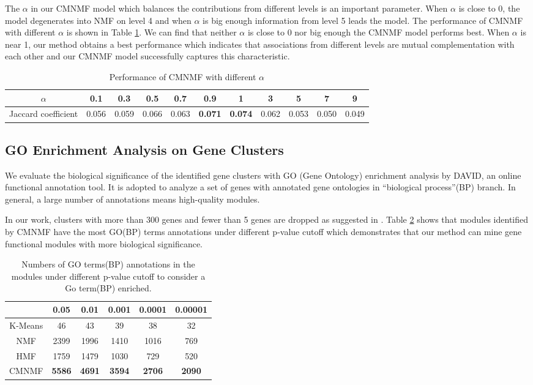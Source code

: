 \documentclass{bmcart}
\begin{document}
The $\alpha$ in our CMNMF model which balances the contributions from different levels is an important parameter. When $\alpha$ is close to 0, the model degenerates into NMF on level 4 and when $\alpha$ is big enough information from level 5 leads the model. The performance of CMNMF with different $\alpha$ is shown in Table \ref{tab:alpha_tune}. We can find that neither $\alpha$ is close to 0 nor big enough the CMNMF model performs best. When $\alpha$ is near 1, our method obtains a best performance which indicates that associations from different levels are mutual complementation with each other and our CMNMF model successfully captures this characteristic.
\begin{table}
\centering
\caption{Performance of CMNMF with different $\alpha$}
\label{tab:alpha_tune}
\begin{tabular}{|c||c|c|c|c|c|c|c|c|c|c|}
\hline
 $\alpha$ &0.1& 0.3&0.5&0.7&0.9&1&3&5&7&9\\
\hline
Jaccard coefficient& 0.056 & 0.059 & 0.066 & 0.063 & \textbf{0.071}& \textbf{0.074} & 0.062 & 0.053 & 0.050 & 0.049\\
\hline
\end{tabular}
\end{table}

\subsection*{GO Enrichment Analysis on Gene Clusters}
We evaluate the biological significance of the identified gene clusters with GO (Gene Ontology) enrichment analysis by DAVID\cite{David}, an online functional annotation tool. It is adopted to analyze a set of genes with annotated gene ontologies in ``biological process''(BP) branch. In general, a large number of annotations means high-quality modules.

In our work, clusters with more than 300 genes and fewer than 5 genes are dropped as suggested in \cite{SMNMF}. Table \ref{tab:go} shows that modules identified by CMNMF have the most GO(BP) terms annotations under different p-value cutoff which demonstrates that our method can mine gene functional modules with more biological significance.

\begin{table}
\centering
\caption{Numbers of GO terms(BP) annotations in the modules under different p-value cutoff to consider a Go term(BP) enriched.}
\label{tab:go}
\begin{tabular}{|c||c|c|c|c|c|}
\hline
 &0.05 & 0.01& 0.001&0.0001&0.00001\\
\hline
\hline
K-Means&46  & 43& 39&38&32\\
\hline
NMF&2399 & 1996&1410&1016&769\\
\hline
HMF&1759& 1479&1030&729&520\\
\hline
CMNMF&\textbf{5586}& \textbf{4691}& \textbf{3594}&\textbf{2706}&\textbf{2090}\\
\hline
\end{tabular}
\end{table}
\end{document}
